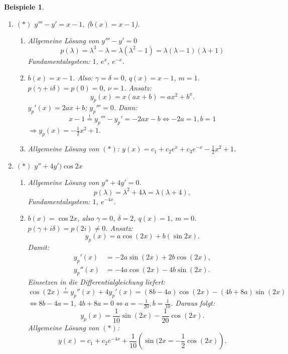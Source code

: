 \documentclass[12pt]{extreport} %
\theoremstyle{named}
\theoremstyle{nnamed}
\theoremstyle{itshape}
\theoremstyle{normal}
\newtheorem*{beispiele}{Beispiele}
\begin{document}
\begin{beispiele} ~\
	\begin{enumerate}
		\item $(*)$ $y''' - y' = x - 1$, ($b(x) = x - 1$).
			\begin{enumerate}[label=\arabic*.]
				\item Allgemeine Lösung von $y''' - y' = 0$
					$$ p(\lambda) = \lambda^{3} - \lambda = \lambda \left(\lambda^{2} - 1\right) = \lambda (\lambda - 1) (\lambda + 1) $$
					Fundamentalsystem: $1$, $e^{x}$, $e^{-x}$.
				\item $b(x) = x - 1$. Also: $\gamma = \delta = 0$, $q(x) = x - 1$, $m = 1$. $p(\gamma + i\delta) = p(0) = 0$, $\nu =1$. Ansatz:
					$$ y_{p}(x) = x (ax + b) = ax^{2} + b^x. $$
					$y_{p}'(x) = 2ax + b$; $y_{p}''' = 0$. Dann:
					$$ x - 1 \overset{!}{=} y_{p}''' - y_{p}' = -2ax - b \iff -2a = 1, b = 1 $$
					$\Rightarrow y_{p}(x) = -\frac{1}{2} x^{2} + 1$.
				\item Allgemeine Lösung von $(*)$: $y(x) = c_{1} + c_{2} e^{x} + c_{3} e^{-x} - \frac{1}{2} x^{2} + 1$.
			\end{enumerate}
		\item  $(*)$ $y'' + 4y' ) \cos 2x$
			\begin{enumerate}[label=\arabic*.]
				\item Allgemeine Lösung von $y'' + 4y' = 0$.
					$$ p(\lambda) = \lambda^{2} + 4\lambda = \lambda ( \lambda + 4), $$
					Fundamentalsystem: $1$, $e^{-4x}$.
				\item $b(x) = \cos 2x$, also $\gamma = 0$, $\delta = 2$, $q(x) = 1$, $m = 0$. $p(\gamma + i\delta) = p(2i) \neq 0$. Ansatz:
					$$ y_{p}(x) = a\cos(2x) + b \left( \sin 2x \right). $$
					Damit:
					\begin{align*}
						y_{p}'(x) & = -2a \sin (2x) + 2b\cos(2x), \\
						y_{p}''(x) & = -4a \cos(2x) - 4b \sin(2x). 
					\end{align*}
					Einsetzen in die Differentialgleichung liefert:
					$$ \cos(2x) \overset{!}{=} y_{p}''(x) + 4y_{p}'(x) = \left(8b - 4a \right) \cos(2x) - \left(4b+8a\right) \sin(2x) $$
					$\iff 8b - 4a = 1$, $4b + 8a = 0 \iff a = -\frac{1}{20}, b = \frac{1}{10}$. Daraus folgt:
						$$ y_{p}(x) = \frac{1}{10} \sin (2x) - \frac{1}{20} \cos(2x). $$
					Allgemeine Lösung von $(*)$:
					$$ y(x) = c_{1} + c_{2} e^{-4x} + \frac{1}{10} \left( \sin(2x= - \frac{1}{2} \cos (2x) \right). $$
			\end{enumerate}
	\end{enumerate}
\end{beispiele}
\end{document}
